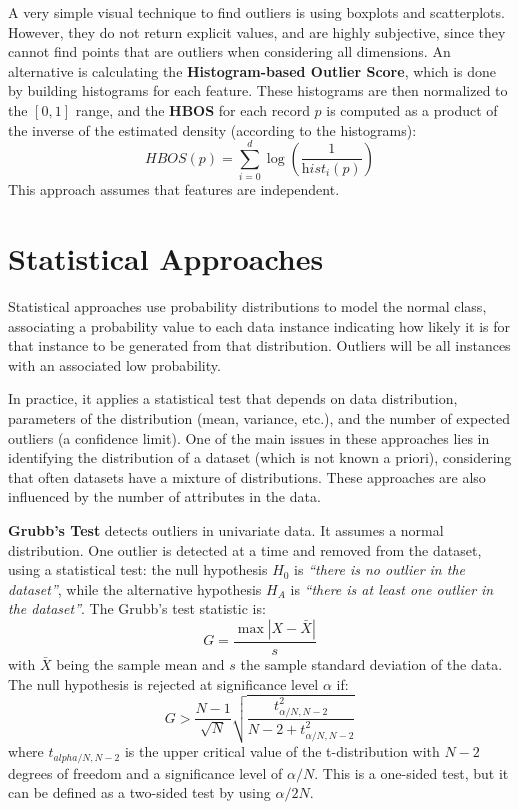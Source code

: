A very simple visual technique to find outliers is using boxplots and scatterplots. However, they do not return explicit values, and are highly subjective, since they cannot find points that are outliers when considering all dimensions. An alternative is calculating the \textbf{Histogram-based Outlier Score}, which is done by building histograms for each feature. These histograms are then normalized to the $[0,1]$ range, and the \textbf{HBOS} for each record $p$ is computed as a product of the inverse of the estimated density (according to the histograms):
\begin{equation*}
    \textit{HBOS}(p) = \sum_{i=0}^d \log(\dfrac{1}{\textit{hist}_i(p)})
\end{equation*}
This approach assumes that features are independent.

\section{Statistical Approaches}

Statistical approaches use probability distributions to model the normal class, associating a probability value to each data instance indicating how likely it is for that instance to be generated from that distribution. Outliers will be all instances with an associated low probability.

In practice, it applies a statistical test that depends on data distribution, parameters of the distribution (mean, variance, etc.), and the number of expected outliers (a confidence limit). One of the main issues in these approaches lies in identifying the distribution of a dataset (which is not known a priori), considering that often datasets have a mixture of distributions. These approaches are also influenced by the number of attributes in the data.

\textbf{Grubb's Test} detects outliers in univariate data. It assumes a normal distribution. One outlier is detected at a time and removed from the dataset, using a statistical test: the null hypothesis $H_0$ is \textit{``there is no outlier in the dataset''}, while the alternative hypothesis $H_A$ is \textit{``there is at least one outlier in the dataset''}. The Grubb's test statistic is:
\begin{equation*}
    G = \dfrac{\max |X - \bar{X}|}{s} 
\end{equation*}
with $\bar{X}$ being the sample mean and $s$ the sample standard deviation of the data.
The null hypothesis is rejected at significance level $\alpha$ if:
\begin{equation*}
    G > \dfrac{N-1}{\sqrt{N}} \sqrt{\dfrac{t^2_{\alpha/N, N-2}}{N-2+t^2_{\alpha/N, N-2}}}
\end{equation*}
where $t_{alpha/N, N-2}$ is the upper critical value of the t-distribution with $N-2$ degrees of freedom and a significance level of $\alpha/N$. This is a one-sided test, but it can be defined as a two-sided test by using $\alpha/2N$.

